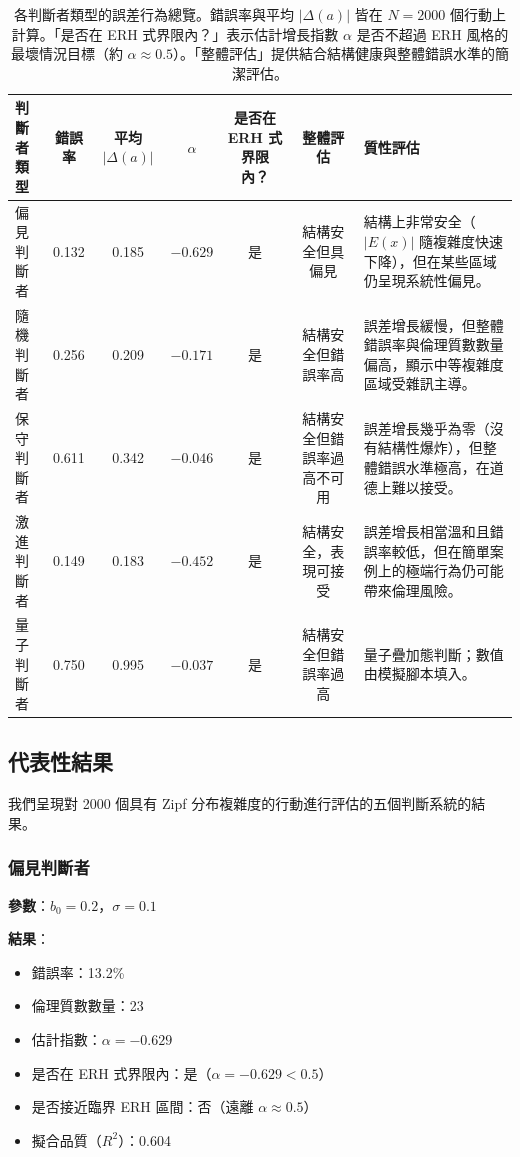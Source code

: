 \documentclass[12pt,a4paper]{article}
\theoremstyle{definition}
\theoremstyle{remark}
\begin{document}
\begin{table}[htbp]
\centering
\caption{各判斷者類型的誤差行為總覽。錯誤率與平均 $|\Delta(a)|$ 皆在 $N = 2000$ 個行動上計算。「是否在 ERH 式界限內？」表示估計增長指數 $\alpha$ 是否不超過 ERH 風格的最壞情況目標（約 $\alpha \approx 0.5$）。「整體評估」提供結合結構健康與整體錯誤水準的簡潔評估。}
\label{tab:summary_judges_zh}
\begin{tabular}{lcccccp{5cm}}
\toprule
\textbf{判斷者類型} & \textbf{錯誤率} & \textbf{平均 $|\Delta(a)|$} & \textbf{$\alpha$} & \textbf{是否在 ERH 式界限內？} & \textbf{整體評估} & \textbf{質性評估} \\
\midrule
偏見判斷者       & 0.132 & 0.185 & $-0.629$ & 是 & 結構安全但具偏見 & 結構上非常安全（$|E(x)|$ 隨複雜度快速下降），但在某些區域仍呈現系統性偏見。 \\
隨機判斷者       & 0.256 & 0.209 & $-0.171$ & 是 & 結構安全但錯誤率高 & 誤差增長緩慢，但整體錯誤率與倫理質數數量偏高，顯示中等複雜度區域受雜訊主導。 \\
保守判斷者       & 0.611 & 0.342 & $-0.046$ & 是 & 結構安全但錯誤率過高不可用 & 誤差增長幾乎為零（沒有結構性爆炸），但整體錯誤水準極高，在道德上難以接受。 \\
激進判斷者       & 0.149 & 0.183 & $-0.452$ & 是 & 結構安全，表現可接受 & 誤差增長相當溫和且錯誤率較低，但在簡單案例上的極端行為仍可能帶來倫理風險。 \\
量子判斷者       & 0.750 & 0.995 & $-0.037$ & 是 & 結構安全但錯誤率過高 & 量子疊加態判斷；數值由模擬腳本填入。 \\
\bottomrule
\end{tabular}
\end{table}

\subsection{代表性結果}

我們呈現對 2000 個具有 Zipf 分布複雜度的行動進行評估的五個判斷系統的結果。

\subsubsection{偏見判斷者}

\textbf{參數}：$b_0 = 0.2$，$\sigma = 0.1$

\textbf{結果}：
\begin{itemize}
    \item 錯誤率：13.2\%
    \item 倫理質數數量：23
    \item 估計指數：$\alpha = -0.629$
    \item 是否在 ERH 式界限內：是（$\alpha = -0.629 < 0.5$）
    \item 是否接近臨界 ERH 區間：否（遠離 $\alpha \approx 0.5$）
    \item 擬合品質（$R^2$）：0.604
\end{itemize}
\end{document}
